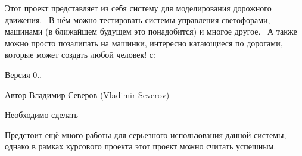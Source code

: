 Этот проект представляет из себя систему для моделирования дорожного движения.~\newline
 В нём можно тестировать системы управления светофорами, машинами (в ближайшем будущем это понадобится) и многое другое.~\newline
 А также можно просто позалипать на машинки, интересно катающиеся по дорогами, которые может создать любой человек! с\+: \begin{DoxyVersion}{Версия}
0.. 
\end{DoxyVersion}
\begin{DoxyAuthor}{Автор}
Владимир Северов (Vladimir Severov) 
\end{DoxyAuthor}
\begin{DoxyRefDesc}{Необходимо сделать}
\item[\hyperlink{todo__todo000001}{Необходимо сделать}]Предстоит ещё много работы для серьезного использования данной системы, однако в рамках курсового проекта этот проект можно считать успешным. \end{DoxyRefDesc}

